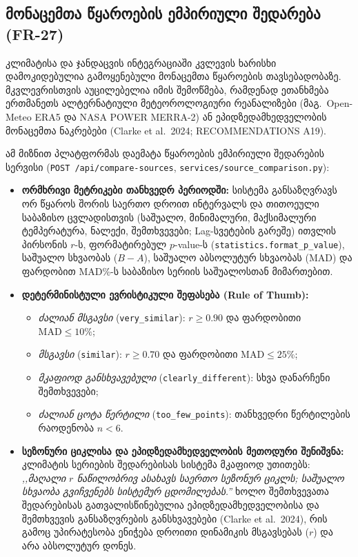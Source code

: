 \documentclass[11pt,a4paper]{article}
\begin{document}
\subsection{მონაცემთა წყაროების ემპირიული შედარება (FR-27)}
კლიმატისა და ჯანდაცვის ინტეგრაციაში კვლევის ხარისხი დამოკიდებულია გამოყენებული
მონაცემთა წყაროების თავსებადობაზე. მკვლევრისთვის აუცილებელია იმის შემოწმება,
რამდენად ეთანხმება ერთმანეთს ალტერნატიული მეტეოროლოგიური რეანალიზები
(მაგ.\ Open-Meteo ERA5 და NASA POWER MERRA-2) ან ეპიდზედამხედველობის
მონაცემთა ნაკრებები (Clarke et al.\ 2024; RECOMMENDATIONS A19).

ამ მიზნით პლატფორმას დაემატა წყაროების ემპირიული შედარების სერვისი
(\texttt{POST /api/compare-sources}, \texttt{services/source\_comparison.py}):
\begin{itemize}[leftmargin=1.4em]
  \item \textbf{ორმხრივი მეტრიკები თანხვედრ პერიოდში:} სისტემა განსაზღვრავს ორ
    წყაროს შორის საერთო დროით ინტერვალს და თითოეული საბაზისო ცვლადისთვის
    (საშუალო, მინიმალური, მაქსიმალური ტემპერატურა, ნალექი, შემთხვევები;
    Lag-სვეტების გარეშე) ითვლის პირსონის $r$-ს, ფორმატირებულ $p$-value-ს
    (\texttt{statistics.format\_p\_value}), საშუალო სხვაობას ($B - A$),
    საშუალო აბსოლუტურ სხვაობას (MAD) და ფარდობით MAD\%-ს საბაზისო სერიის საშუალოსთან მიმართებით.
  \item \textbf{დეტერმინისტული ევრისტიკული შეფასება (Rule of Thumb):}
    \begin{itemize}
      \item \emph{ძალიან მსგავსი} (\texttt{very\_similar}): $r \ge 0.90$ და ფარდობითი $\mathrm{MAD} \le 10\%$;
      \item \emph{მსგავსი} (\texttt{similar}): $r \ge 0.70$ და ფარდობითი $\mathrm{MAD} \le 25\%$;
      \item \emph{მკაფიოდ განსხვავებული} (\texttt{clearly\_different}): სხვა დანარჩენი შემთხვევები;
      \item \emph{ძალიან ცოტა წერტილი} (\texttt{too\_few\_points}): თანხვედრი წერტილების რაოდენობა $n < 6$.
    \end{itemize}
  \item \textbf{სეზონური ციკლისა და ეპიდზედამხედველობის მეთოდური შენიშვნა:}
    კლიმატის სერიების შედარებისას სისტემა მკაფიოდ უთითებს: \emph{,,მაღალი $r$ ნაწილობრივ ასახავს საერთო სეზონურ ციკლს; საშუალო სხვაობა გვიჩვენებს სისტემურ ცდომილებას.''}
    ხოლო შემთხვევათა შედარებისას გათვალისწინებულია ეპიდზედამხედველობისა და შემთხვევის განსაზღვრების
    განსხვავებები (Clarke et al.\ 2024), რის გამოც უპირატესობა ენიჭება დროითი დინამიკის მსგავსებას ($r$) და არა აბსოლუტურ დონეს.

\end{itemize}
\end{document}
